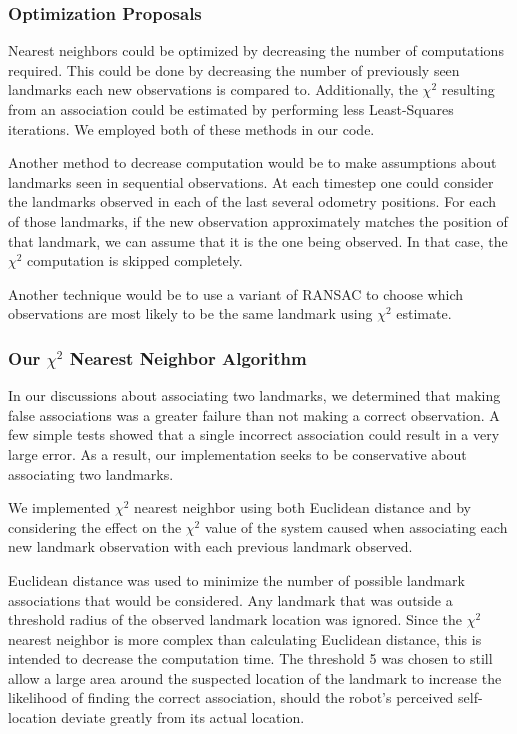 \documentclass[12pt]{article}
\begin{document}
\subsubsection*{Optimization Proposals}
Nearest neighbors could be optimized by decreasing the number of computations required.  This could be done by decreasing the number of previously seen landmarks each new observations is compared to.  Additionally, the $\chi^2$ resulting from an association could be estimated by performing less Least-Squares iterations. We employed both of these methods in our code.

Another method to decrease computation would be to make assumptions about landmarks seen in sequential observations.  At each timestep one could consider the landmarks observed in each of the last several odometry positions.  For each of those landmarks, if the new observation approximately matches the position of that landmark, we can assume that it is the one being observed. In that case, the $\chi^2$ computation is skipped completely.

Another technique would be to use a variant of RANSAC to choose which observations are most likely to be the same landmark using $\chi^2$ estimate.

\subsubsection*{Our $\chi^2$ Nearest Neighbor Algorithm}
In our discussions about associating two landmarks, we determined that making false associations was a greater failure than not making a correct observation.  A few simple tests showed that a single incorrect association could result in a very large error.  As a result, our implementation seeks to be conservative about associating two landmarks.

We implemented $\chi^2$ nearest neighbor using both Euclidean distance and by considering the effect on the $\chi^2$ value of the system caused when associating each new landmark observation with each previous landmark observed.

Euclidean distance was used to minimize the number of possible landmark associations that would be considered.  Any landmark that was outside a threshold radius of the observed landmark location was ignored.  Since the $\chi^2$ nearest neighbor is more complex than calculating Euclidean distance, this is intended to decrease the computation time.  The threshold 5 was chosen to still allow a large area around the suspected location of the landmark to increase the likelihood of finding the correct association, should the robot's perceived self-location deviate greatly from its actual location.
\end{document}
